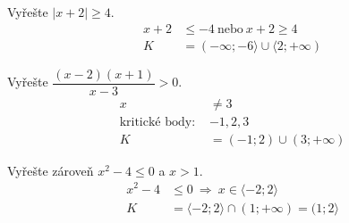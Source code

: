 \documentclass[11pt,a4paper]{article}
\begin{document}
\begin{zadaniReseniBox}[title={Samostatná práce 2}]
Vyřešte $|x+2|\ge4$.
\tcblower
\[
\begin{aligned}
x+2&\le-4\ \text{nebo}\ x+2\ge4\\
K&=(-\infty;-6\rangle\cup\langle2;+\infty)
\end{aligned}
\]

\end{zadaniReseniBox}
\begin{zadaniReseniBox}[title={Samostatná práce 3}]
Vyřešte $\dfrac{(x-2)(x+1)}{x-3}>0$.
\tcblower
\[
\begin{aligned}
x&\ne3\\
\text{kritické body: }&-1,2,3\\
K&=(-1;2)\cup(3;+\infty)
\end{aligned}
\]

\end{zadaniReseniBox}
\begin{zadaniReseniBox}[title={Samostatná práce 4}]
Vyřešte zároveň $x^2-4\le0$ a $x>1$.
\tcblower
\[
\begin{aligned}
x^2-4&\le0\ \Rightarrow\ x\in\langle-2;2\rangle\\
K&=\langle-2;2\rangle\cap(1;+\infty)=(1;2\rangle
\end{aligned}
\]

\end{zadaniReseniBox}
\end{document}
